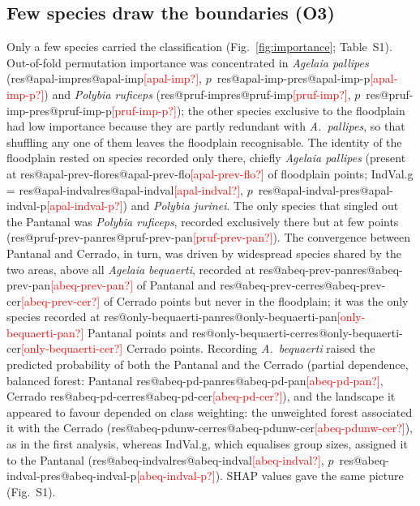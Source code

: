 \documentclass[10pt,a4paper,twocolumn]{article}
\makeatletter
\newcommand{\res}[1]{\ifcsname res@#1\endcsname\csname res@#1\endcsname\else\textcolor{red}{[#1?]}\fi}
\newcommand{\taxon}[1]{\textit{#1}}
\makeatother
\begin{document}
\subsection{Few species draw the boundaries (O3)}\label{sec:rO3}
Only a few species carried the classification (Fig.~\ref{fig:importance}; Table~S1). Out-of-fold
permutation importance was concentrated in \taxon{Agelaia pallipes} (\res{apal-imp}, $p$~\res{apal-imp-p})
and \taxon{Polybia ruficeps} (\res{pruf-imp}, $p$~\res{pruf-imp-p}); the other species exclusive to the
floodplain had low importance because they are partly redundant with \taxon{A.~pallipes}, so that
shuffling any one of them leaves the floodplain recognisable. The identity
of the floodplain rested on species recorded only there, chiefly \taxon{Agelaia pallipes} (present at
\res{apal-prev-flo} of floodplain points; IndVal.g = \res{apal-indval}, $p$~\res{apal-indval-p}) and
\taxon{Polybia jurinei}. The only species that singled out the Pantanal was \taxon{Polybia ruficeps},
recorded exclusively there but at few points (\res{pruf-prev-pan}). The convergence between Pantanal
and Cerrado, in turn, was driven by widespread species shared by the two areas, above all
\taxon{Agelaia bequaerti}, recorded at \res{abeq-prev-pan} of Pantanal and \res{abeq-prev-cer} of Cerrado
points but never in the floodplain; it was the only species recorded at \res{only-bequaerti-pan}
Pantanal points and \res{only-bequaerti-cer} Cerrado points. Recording \taxon{A.~bequaerti} raised the
predicted probability of both the Pantanal and the Cerrado (partial dependence, balanced forest:
Pantanal \res{abeq-pd-pan}, Cerrado \res{abeq-pd-cer}), and the landscape it appeared to favour
depended on class weighting: the unweighted forest associated it with the Cerrado
(\res{abeq-pdunw-cer}), as in the first analysis, whereas IndVal.g, which equalises group sizes,
assigned it to the Pantanal (\res{abeq-indval}, $p$~\res{abeq-indval-p}). SHAP values gave the same
picture (Fig.~S1).
\end{document}

